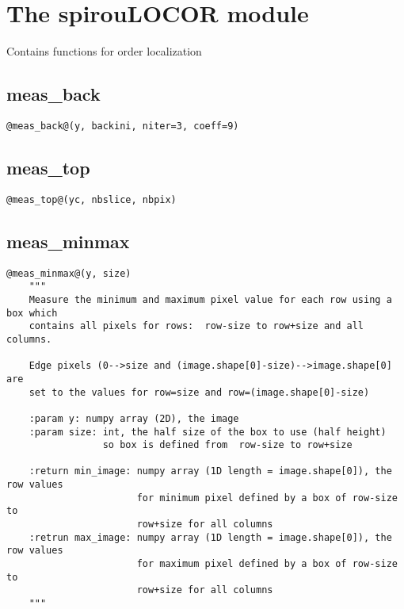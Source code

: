 \clearpage
\newpage
\section{The spirouLOCOR module}

Contains functions for order localization

\subsection{meas\_back}
\begin{lstlisting}[style=pythonstyle]
@meas_back@(y, backini, niter=3, coeff=9)
\end{lstlisting}

\subsection{meas\_top}
\begin{lstlisting}[style=pythonstyle]
@meas_top@(yc, nbslice, nbpix)
\end{lstlisting}

\subsection{meas\_minmax}
\begin{lstlisting}[style=pythonstyle]
@meas_minmax@(y, size)
    """
    Measure the minimum and maximum pixel value for each row using a box which
    contains all pixels for rows:  row-size to row+size and all columns.

    Edge pixels (0-->size and (image.shape[0]-size)-->image.shape[0] are
    set to the values for row=size and row=(image.shape[0]-size)

    :param y: numpy array (2D), the image
    :param size: int, the half size of the box to use (half height)
                 so box is defined from  row-size to row+size

    :return min_image: numpy array (1D length = image.shape[0]), the row values
                       for minimum pixel defined by a box of row-size to
                       row+size for all columns
    :retrun max_image: numpy array (1D length = image.shape[0]), the row values
                       for maximum pixel defined by a box of row-size to
                       row+size for all columns
    """
\end{lstlisting}

